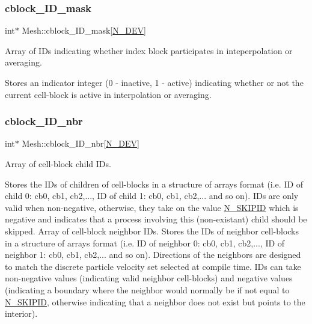 \subsubsection{\texorpdfstring{cblock\+\_\+\+I\+D\+\_\+mask}{cblock\_ID\_mask}}
{\footnotesize\ttfamily int$\ast$ Mesh\+::cblock\+\_\+\+I\+D\+\_\+mask\mbox{[}\hyperlink{cppspec_8h_a2b674dab7a14f1bf32b48b7fda5022dc}{N\+\_\+\+D\+EV}\mbox{]}}



Array of I\+Ds indicating whether index block participates in inteperpolation or averaging. 

Stores an indicator integer (0 -\/ inactive, 1 -\/ active) indicating whether or not the current cell-\/block is active in interpolation or averaging. \mbox{\label{classMesh_a81d8e99aa31cb83a0f58805ef1f5ca86}} 
\subsubsection{\texorpdfstring{cblock\+\_\+\+I\+D\+\_\+nbr}{cblock\_ID\_nbr}}
{\footnotesize\ttfamily int$\ast$ Mesh\+::cblock\+\_\+\+I\+D\+\_\+nbr\mbox{[}\hyperlink{cppspec_8h_a2b674dab7a14f1bf32b48b7fda5022dc}{N\+\_\+\+D\+EV}\mbox{]}}



Array of cell-\/block child I\+Ds. 

Stores the I\+Ds of children of cell-\/blocks in a structure of arrays format (i.\+e. ID of child 0\+: cb0, cb1, cb2,..., ID of child 1\+: cb0, cb1, cb2,... and so on). I\+Ds are only valid when non-\/negative, otherwise, they take on the value \hyperlink{cppspec_8h_ae7141a84f3fe0ddcd628a6d8ee0a4ea8}{N\+\_\+\+S\+K\+I\+P\+ID} which is negative and indicates that a process involving this (non-\/existant) child should be skipped. Array of cell-\/block neighbor I\+Ds. Stores the I\+Ds of neighbor cell-\/blocks in a structure of arrays format (i.\+e. ID of neighbor 0\+: cb0, cb1, cb2,..., ID of neighbor 1\+: cb0, cb1, cb2,... and so on). Directions of the neighbors are designed to match the discrete particle velocity set selected at compile time. I\+Ds can take non-\/negative values (indicating valid neighbor cell-\/blocks) and negative values (indicating a boundary where the neighbor would normally be if not equal to \hyperlink{cppspec_8h_ae7141a84f3fe0ddcd628a6d8ee0a4ea8}{N\+\_\+\+S\+K\+I\+P\+ID}, otherwise indicating that a neighbor does not exist but points to the interior). \mbox{\label{classMesh_abb8b2b9b54bc8d342bd5db602063f133}} 
